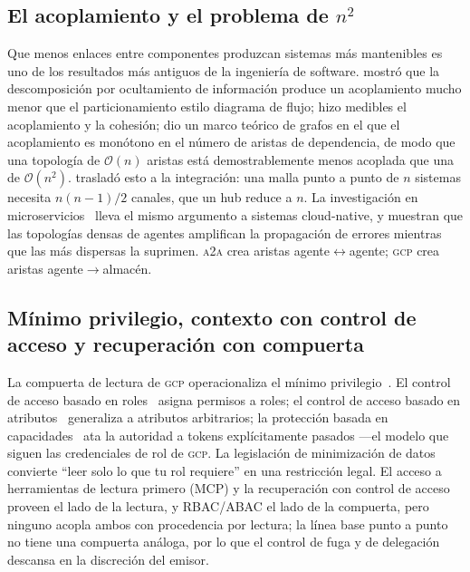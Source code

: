 \documentclass[conference,letterpaper]{IEEEtran}
\newcommand{\gcp}{\textsc{gcp}}
\newcommand{\ata}{\textsc{a2a}}
\newcommand{\bigoh}{\mathcal{O}}
\begin{document}
\subsection{El acoplamiento y el problema de $n^2$}
Que menos enlaces entre componentes produzcan sistemas m\'as mantenibles es uno de los resultados
m\'as antiguos de la ingenier\'ia de software. \citet{parnas1972} mostr\'o que la descomposici\'on por
ocultamiento de informaci\'on produce un acoplamiento mucho menor que el particionamiento estilo
diagrama de flujo; \citet{stevens1974} hizo medibles el acoplamiento y la cohesi\'on;
\citet{briand1999} dio un marco te\'orico de grafos en el que el acoplamiento es mon\'otono en el
n\'umero de aristas de dependencia, de modo que una topolog\'ia de $\bigoh(n)$ aristas est\'a
demostrablemente menos acoplada que una de $\bigoh(n^2)$. \citet{hohpe2003} traslad\'o esto a la
integraci\'on: una malla punto a punto de $n$ sistemas necesita $n(n{-}1)/2$ canales, que un hub
reduce a $n$. La investigaci\'on en microservicios~\citep{panichella2021} lleva el mismo argumento a
sistemas cloud-native, y \citet{shen2025topology} muestran que las topolog\'ias densas de agentes
amplifican la propagaci\'on de errores mientras que las m\'as dispersas la suprimen. \ata{} crea
aristas agente$\leftrightarrow$agente; \gcp{} crea aristas agente$\rightarrow$almac\'en.

\subsection{M\'inimo privilegio, contexto con control de acceso y recuperaci\'on con compuerta}
La compuerta de lectura de \gcp{} operacionaliza el m\'inimo privilegio~\citep{saltzer1975}. El
control de acceso basado en roles~\citep{sandhu1996} asigna permisos a roles; el control de acceso
basado en atributos~\citep{nist800162} generaliza a atributos arbitrarios; la protecci\'on basada en
capacidades~\citep{dennis1966} ata la autoridad a tokens expl\'icitamente pasados ---el modelo que
siguen las credenciales de rol de \gcp{}. La legislaci\'on de minimizaci\'on de datos~\citep{gdpr2016}
convierte ``leer solo lo que tu rol requiere'' en una restricci\'on legal. El acceso a herramientas de
lectura primero (MCP) y la recuperaci\'on con control de acceso proveen el lado de la lectura, y
RBAC/ABAC el lado de la compuerta, pero ninguno acopla ambos con procedencia por lectura; la l\'inea
base punto a punto no tiene una compuerta an\'aloga, por lo que el control de fuga y de delegaci\'on
descansa en la discreci\'on del emisor.
\end{document}
